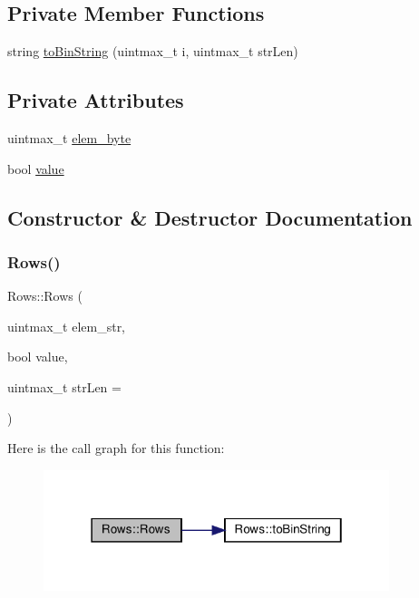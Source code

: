\subsection*{Private Member Functions}
\begin{DoxyCompactItemize}
\item 
string \hyperlink{class_rows_aa610ff44d051eededf3c25928987bb81}{to\+Bin\+String} (uintmax\+\_\+t i, uintmax\+\_\+t str\+Len)
\end{DoxyCompactItemize}
\subsection*{Private Attributes}
\begin{DoxyCompactItemize}
\item 
uintmax\+\_\+t \hyperlink{class_rows_ac2cf1184df80a0fdab7da08e13c050ba}{elem\+\_\+byte}
\item 
bool \hyperlink{class_rows_a2b3d2fabf2107acdce437f8896a9d999}{value}
\end{DoxyCompactItemize}


\subsection{Constructor \& Destructor Documentation}
\mbox{\label{class_rows_a6c48a7781d187ab7908a772cd0df1a28}} 
\subsubsection{\texorpdfstring{Rows()}{Rows()}}
{\footnotesize\ttfamily Rows\+::\+Rows (\begin{DoxyParamCaption}\item[{uintmax\+\_\+t}]{elem\+\_\+str,  }\item[{bool}]{value,  }\item[{uintmax\+\_\+t}]{str\+Len = {} }\end{DoxyParamCaption})}

Here is the call graph for this function\+:\nopagebreak
\begin{figure}[H]
\begin{center}
\leavevmode
\includegraphics[width=286pt]{d6/d54/class_rows_a6c48a7781d187ab7908a772cd0df1a28_cgraph}
\end{center}
\end{figure}


